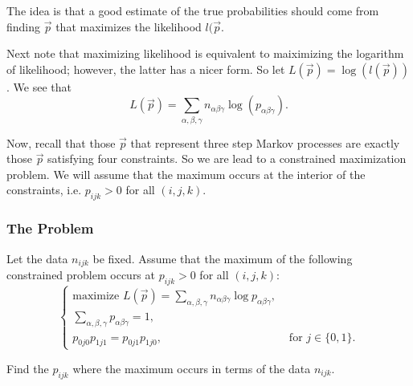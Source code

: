 The idea is that a good estimate of the true probabilities should come from finding \(\vec p\) that
maximizes the likelihood \(l(\vec p\). 

Next note that maximizing likelihood is equivalent to maiximizing the logarithm of likelihood; however,
the latter has a nicer form. So let \(L(\vec p) = \log(l(\vec p))\). We see that
\begin{equation}
L(\vec p) = \sum_{\alpha, \beta, \gamma} n_{\alpha\beta\gamma} \log(p_{\alpha\beta\gamma}).
\end{equation}

Now, recall that those \(\vec p\) that represent three step Markov processes are exactly those \(\vec p\) 
satisfying four constraints. So we are lead to a constrained maximization problem. We will assume that
the maximum occurs at the interior of the constraints, i.e. \(p_{ijk} > 0\) for all \((i, j, k)\). 

\subsubsection*{The Problem}

Let the data \(n_{ijk}\) be fixed. Assume that the maximum of the following constrained problem occurs at \(p_{ijk} > 0\) for all \((i, j, k)\):
\begin{equation}
\begin{cases}
\text{maximize } L(\vec p) = \sum_{\alpha, \beta, \gamma} n_{\alpha\beta\gamma} \log p_{\alpha\beta\gamma}, \\
\sum_{\alpha, \beta, \gamma} p_{\alpha\beta\gamma} = 1, \\
p_{0j0} p_{1j1} = p_{0j1} p_{1j0}, & \text{ for } j \in \{0, 1\}.
\end{cases}
\end{equation}

Find the \(p_{ijk}\) where the maximum occurs in terms of the data \(n_{ijk}\).
